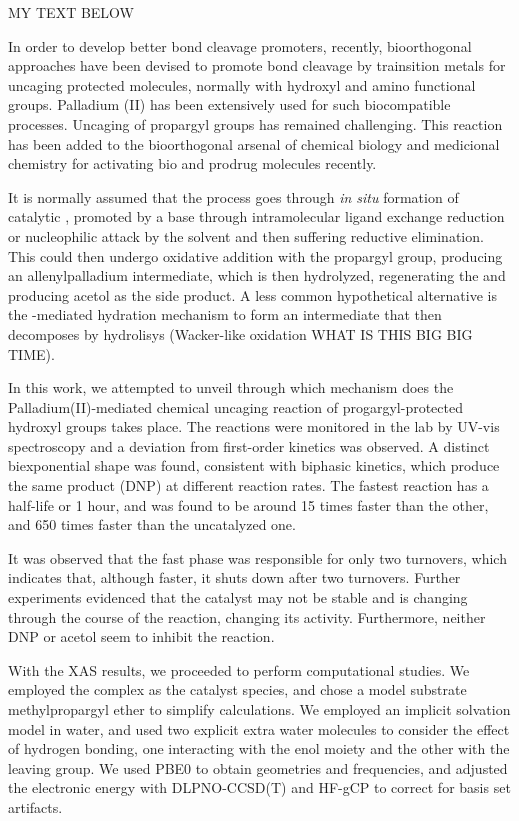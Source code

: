 MY TEXT BELOW

In order to develop better  bond cleavage promoters,
recently, bioorthogonal approaches have been devised to promote  bond
cleavage by trainsition metals for uncaging protected molecules, normally with
hydroxyl and amino functional groups.
Palladium (II) has been extensively used for such biocompatible processes.
Uncaging of propargyl groups has remained challenging.
This reaction has been added to the bioorthogonal arsenal of chemical biology and
medicional chemistry for activating bio and prodrug molecules recently.

It is normally assumed that the process goes through \emph{in situ} formation
of catalytic , promoted by a base through intramolecular ligand exchange
reduction or nucleophilic attack by the solvent and then suffering reductive
elimination.
This  could then undergo oxidative addition with the
propargyl group, producing an allenylpalladium intermediate, which is then
hydrolyzed, regenerating the  and producing acetol as the side product.
A less common hypothetical alternative is the -mediated hydration
mechanism to form an intermediate that then decomposes by hydrolisys
(Wacker-like oxidation WHAT IS THIS BIG BIG TIME).

In this work, we attempted to unveil through which mechanism does
the Palladium(II)-mediated chemical uncaging reaction of
progargyl-protected hydroxyl groups takes place.
The reactions were monitored in the lab by UV-vis spectroscopy and a deviation
from first-order kinetics was observed.
A distinct biexponential shape was found, consistent with biphasic kinetics,
which produce the same product (DNP) at different reaction rates.
The fastest reaction has a half-life or 1 hour, and was found to be around 15 times faster than the other, and
650 times faster than the uncatalyzed one.

It was observed that the fast phase was responsible for only two turnovers,
which indicates that, although faster, it shuts down after two turnovers.
Further experiments evidenced that the catalyst may not be stable and is changing through the
course of the reaction, changing its activity.
Furthermore, neither DNP or acetol seem to inhibit the reaction.

With the XAS results, we proceeded to perform computational studies.
We employed the  complex as the catalyst species, and chose a
model substrate methylpropargyl ether to simplify calculations.
We employed an implicit solvation model in water, and used two explicit extra
water molecules to consider the effect of hydrogen bonding, one interacting
with the enol moiety and the other with the leaving group.
We used PBE0 to obtain geometries and frequencies, and adjusted the electronic
energy with DLPNO-CCSD(T) and HF-gCP to correct for basis set artifacts.

